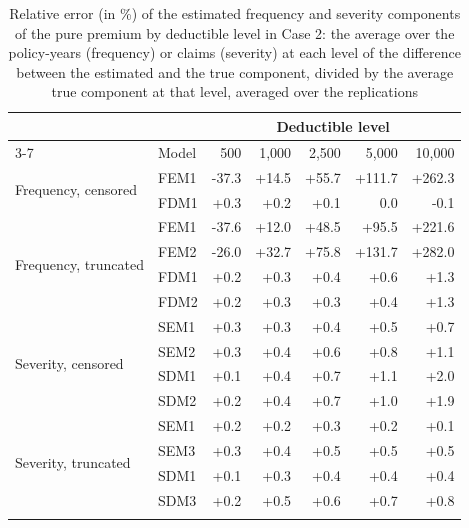 \begin{table}[!ht]
\footnotesize
\centering
{\color{blue}
\begin{tabular}{llrrrrr}
\toprule
 & & \multicolumn{5}{c}{Deductible level} \\
\cmidrule(lr){3-7}
 & Model &    500 &  1,000 &  2,500 &  5,000 & 10,000 \\
\midrule
\multirow{2}{*}{Frequency, censored} & FEM1 & -37.3 & +14.5 & +55.7 & +111.7 & +262.3 \\
 & FDM1 & +0.3 & +0.2 & +0.1 & 0.0 & -0.1 \\
\midrule
\multirow{4}{*}{Frequency, truncated} & FEM1 & -37.6 & +12.0 & +48.5 & +95.5 & +221.6 \\
 & FEM2 & -26.0 & +32.7 & +75.8 & +131.7 & +282.0 \\
 & FDM1 & +0.2 & +0.3 & +0.4 & +0.6 & +1.3 \\
 & FDM2 & +0.2 & +0.3 & +0.3 & +0.4 & +1.3 \\
\midrule
\multirow{4}{*}{Severity, censored} & SEM1 & +0.3 & +0.3 & +0.4 & +0.5 & +0.7 \\
 & SEM2 & +0.3 & +0.4 & +0.6 & +0.8 & +1.1 \\
 & SDM1 & +0.1 & +0.4 & +0.7 & +1.1 & +2.0 \\
 & SDM2 & +0.2 & +0.4 & +0.7 & +1.0 & +1.9 \\
\midrule
\multirow{4}{*}{Severity, truncated} & SEM1 & +0.2 & +0.2 & +0.3 & +0.2 & +0.1 \\
 & SEM3 & +0.3 & +0.4 & +0.5 & +0.5 & +0.5 \\
 & SDM1 & +0.1 & +0.3 & +0.4 & +0.4 & +0.4 \\
 & SDM3 & +0.2 & +0.5 & +0.6 & +0.7 & +0.8 \\
\hhline{=======}
\end{tabular}
}
\caption{Relative error (in \%) of the estimated frequency and severity components of the pure premium by deductible level in Case 2: the average over the policy-years (frequency) or claims (severity) at each level of the difference between the estimated and the true component, divided by the average true component at that level, averaged over the replications}\label{tab:bylevel2}
\end{table}
